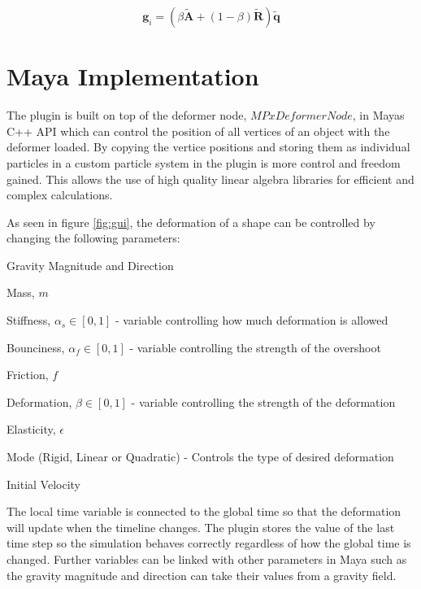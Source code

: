     \begin{equation} \label{eq:newGoal}
        \mathbf{g}_i = (\beta\mathbf{\tilde{A}} + (1 - \beta)\mathbf{\tilde{R}})\mathbf{\tilde{q}}
    \end{equation}
    

\section{Maya Implementation}

The plugin is built on top of the deformer node, $MPxDeformerNode$, in Mayas C++ API which can control the position of all vertices of an object with the deformer loaded. By copying the vertice positions and storing them as individual particles in a custom particle system in the plugin is more control and freedom gained. This allows the use of high quality linear algebra libraries for efficient and complex calculations. 

As seen in figure \ref{fig:gui}, the deformation of a shape can be controlled by changing the following parameters:

\begin{myitemize} 
  \item Gravity Magnitude and Direction 
  \item Mass, $m$
  \item Stiffness, $\alpha_s \in [0,1]$ - variable controlling how much deformation is allowed
  \item Bounciness, $\alpha_f \in [0,1]$ - variable controlling the strength of the overshoot
  \item Friction, $f$
  \item Deformation, $\beta \in [0,1]$ - variable controlling the strength of the deformation
  \item Elasticity, $\epsilon$
  \item Mode (Rigid, Linear or Quadratic) - Controls the type of desired deformation 
  \item Initial Velocity 
\end{myitemize}

The local time variable is connected to the global time so that the deformation will update when the timeline changes. The plugin stores the value of the last time step so the simulation behaves correctly regardless of how the global time is changed. Further variables can be linked with other parameters in Maya such as the gravity magnitude and direction can take their values from a gravity field.

